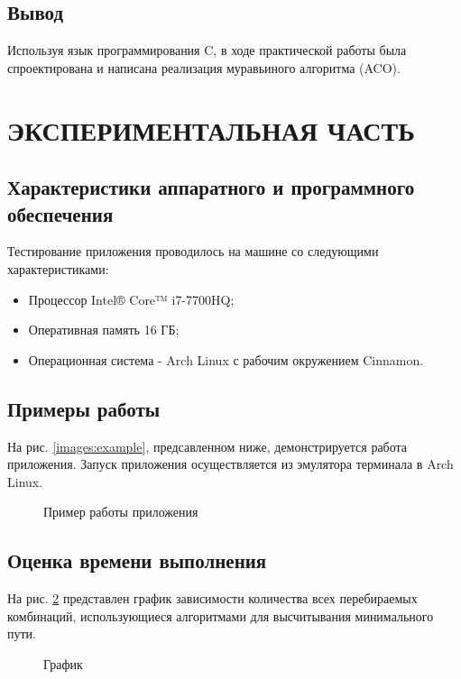 \documentclass[a4paper,12pt]{article}
\begin{document}
\newpage
\subsection{Вывод}
Используя язык программирования C, в ходе практической работы была спроектирована и написана реализация муравьиного алгоритма (ACO).

\newpage
\section{ЭКСПЕРИМЕНТАЛЬНАЯ ЧАСТЬ}
\subsection{Характеристики аппаратного и программного обеспечения}
Тестирование приложения проводилось на машине со следующими характеристиками:\\
\begin{itemize}
\item Процессор Intel® Core™ i7-7700HQ;
\item Оперативная память 16 ГБ;
\item Операционная система - Arch Linux с рабочим окружением Cinnamon.
\end{itemize}

\newpage
\subsection{Примеры работы}
На рис. \ref{images:example}, предсавленном ниже, демонстрируется работа приложения. Запуск приложения осуществляется из эмулятора терминала в Arch Linux.
\begin{figure}[h]
\caption{Пример работы приложения}
\label{images:example1}
\end{figure}

\newpage
\subsection{Оценка времени выполнения}
На рис. \ref{graphics:graphic1} представлен график зависимости количества всех перебираемых комбинаций, использующиеся алгоритмами для высчитывания минимального пути.
\begin{figure}[h]
\caption{График}
\label{graphics:graphic1}
\end{figure}
\end{document}
